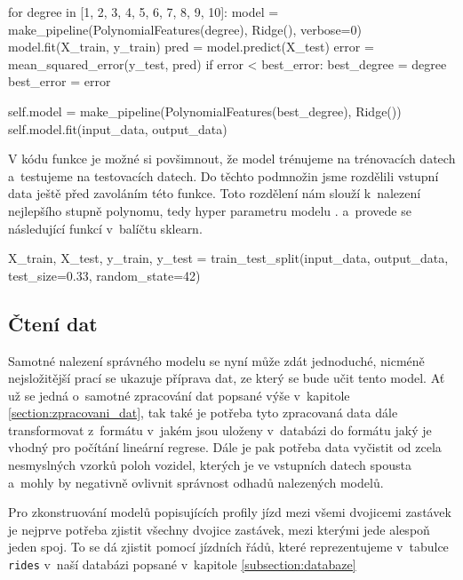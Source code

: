 \begin{code}[frame=none]
for degree in [1, 2, 3, 4, 5, 6, 7, 8, 9, 10]:
  model = make_pipeline(PolynomialFeatures(degree), Ridge(), verbose=0)
  model.fit(X_train, y_train)
  pred = model.predict(X_test)
  error = mean_squared_error(y_test, pred)
  if error < best_error:
    best_degree = degree
    best_error = error


self.model = make_pipeline(PolynomialFeatures(best_degree), Ridge())
self.model.fit(input_data, output_data)
\end{code}

\bigbreak

V kódu funkce je možné si povšimnout, že model trénujeme na trénovacích datech a~testujeme na testovacích datech. Do těchto podmnožin jsme rozdělili vstupní data ještě před zavoláním této funkce. Toto rozdělení nám slouží k~nalezení nejlepšího stupně polynomu, tedy hyper parametru modelu \citep[viz][Strana 365, validation set a~training set]{Ripley96}. a~provede se následující funkcí v~balíčtu sklearn.

\begin{code}[frame=none]
X_train, X_test, y_train, y_test =
  train_test_split(input_data,
    output_data, test_size=0.33, random_state=42)
\end{code}


\subsection{Čtení dat} \label{subsection:cteni_dat}

Samotné nalezení správného modelu se nyní může zdát jednoduché, nicméně nejsložitější prací se ukazuje příprava dat, ze který se bude učit tento model. Ať už se jedná o~samotné zpracování dat popsané výše v~kapitole \ref{section:zpracovani_dat}, tak také je potřeba tyto zpracovaná data dále transformovat z~formátu v~jakém jsou uloženy v~databázi do formátu jaký je vhodný pro počítání lineární regrese. Dále je pak potřeba data vyčistit od zcela nesmyslných vzorků poloh vozidel, kterých je ve vstupních datech spousta a~mohly by negativně ovlivnit správnost odhadů nalezených modelů.

\bigbreak

Pro zkonstruování modelů popisujících profily jízd mezi všemi dvojicemi zastávek je nejprve potřeba zjistit všechny dvojice zastávek, mezi kterými jede alespoň jeden spoj. To se dá zjistit pomocí jízdních řádů, které reprezentujeme v~tabulce \verb-rides- v~naší databázi popsané v~kapitole \ref{subsection:databaze}


